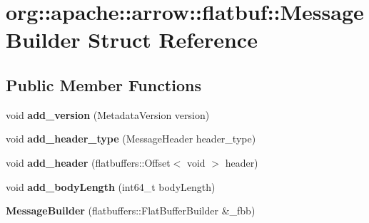 \hypertarget{structorg_1_1apache_1_1arrow_1_1flatbuf_1_1MessageBuilder}{}\section{org\+:\+:apache\+:\+:arrow\+:\+:flatbuf\+:\+:Message\+Builder Struct Reference}
\label{structorg_1_1apache_1_1arrow_1_1flatbuf_1_1MessageBuilder}
\subsection*{Public Member Functions}
\begin{DoxyCompactItemize}
\item 
void {\bfseries add\+\_\+version} (Metadata\+Version version)\hypertarget{structorg_1_1apache_1_1arrow_1_1flatbuf_1_1MessageBuilder_a3e4ebd4b203b1594331ee33f6087ca33}{}\label{structorg_1_1apache_1_1arrow_1_1flatbuf_1_1MessageBuilder_a3e4ebd4b203b1594331ee33f6087ca33}

\item 
void {\bfseries add\+\_\+header\+\_\+type} (Message\+Header header\+\_\+type)\hypertarget{structorg_1_1apache_1_1arrow_1_1flatbuf_1_1MessageBuilder_abc1a9b7a5957d7302397cba835002875}{}\label{structorg_1_1apache_1_1arrow_1_1flatbuf_1_1MessageBuilder_abc1a9b7a5957d7302397cba835002875}

\item 
void {\bfseries add\+\_\+header} (flatbuffers\+::\+Offset$<$ void $>$ header)\hypertarget{structorg_1_1apache_1_1arrow_1_1flatbuf_1_1MessageBuilder_ad5a854876ec9bfe79667c1a6e82f326f}{}\label{structorg_1_1apache_1_1arrow_1_1flatbuf_1_1MessageBuilder_ad5a854876ec9bfe79667c1a6e82f326f}

\item 
void {\bfseries add\+\_\+body\+Length} (int64\+\_\+t body\+Length)\hypertarget{structorg_1_1apache_1_1arrow_1_1flatbuf_1_1MessageBuilder_a7d4f6d98d7e03233d3e426be2bf9d124}{}\label{structorg_1_1apache_1_1arrow_1_1flatbuf_1_1MessageBuilder_a7d4f6d98d7e03233d3e426be2bf9d124}

\item 
{\bfseries Message\+Builder} (flatbuffers\+::\+Flat\+Buffer\+Builder \&\+\_\+fbb)\hypertarget{structorg_1_1apache_1_1arrow_1_1flatbuf_1_1MessageBuilder_ae748629597a2eb7812ae00e3d8085fd1}{}\label{structorg_1_1apache_1_1arrow_1_1flatbuf_1_1MessageBuilder_ae748629597a2eb7812ae00e3d8085fd1}


\end{DoxyCompactItemize}
